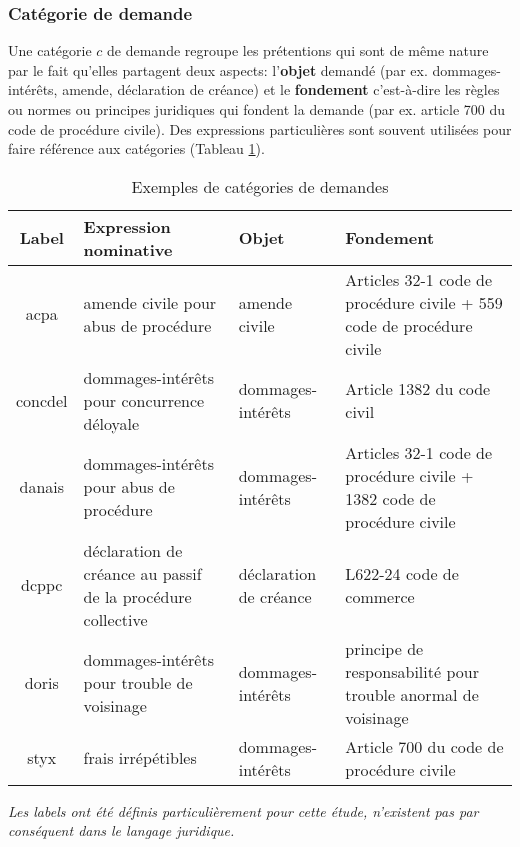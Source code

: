 \subsubsection{Catégorie de demande}

Une catégorie $c$ de demande regroupe les prétentions qui sont de même nature par le fait qu'elles partagent deux aspects: l'\textbf{objet} demandé (par ex. dommages-intérêts, amende, déclaration de créance) et le \textbf{fondement} c'est-à-dire les règles ou normes ou principes juridiques qui fondent la demande (par ex. article 700 du code de procédure civile). Des expressions particulières sont souvent utilisées pour faire référence aux catégories (Tableau \ref{tab:quanta:exemple-categorie}).

\begin{table}[h!]
\scriptsize
\begin{tabular}{|c|p{}|p{}|p{}|}
\hline
\textbf{Label} & \textbf{Expression nominative }                                     & \textbf{Objet}                                                       & \textbf{Fondement}                                                                 \\ \hline
acpa & amende civile pour abus de procédure                         & amende civile                                               & Articles 32-1 code de procédure civile + 559 code de procédure civile  \\ \hline
concdel & dommages-intérêts pour concurrence déloyale                  & dommages-intérêts                                           & Article 1382 du code civil                                             \\ \hline
danais & dommages-intérêts pour abus de procédure                   & dommages-intérêts                                           & Articles 32-1 code de procédure civile + 1382 code de procédure civile \\ \hline
dcppc & déclaration de créance au passif de la procédure collective  & déclaration de créance & L622-24 code de commerce                                               \\ \hline
doris & dommages-intérêts pour trouble de voisinage                  & dommages-intérêts                                           & principe de responsabilité pour trouble anormal de voisinage           \\ \hline
styx & frais irrépétibles                                          & dommages-intérêts                                           & Article 700 du code de procédure civile                                 \\ \hline
\end{tabular}
\textit{Les labels ont été définis particulièrement pour cette étude, n'existent pas par conséquent dans le langage juridique.}
\caption{Exemples de catégories de demandes}\label{tab:quanta:exemple-categorie}
\end{table}

